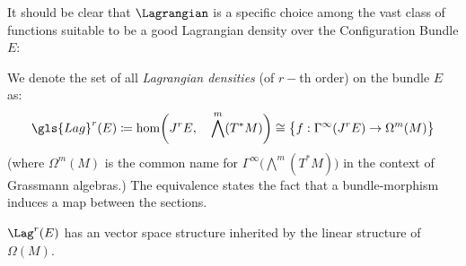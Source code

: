 \documentclass[Main]{subfiles}
\begin{document}
	It should be clear that $\Lagrangian$ is a specific choice among the vast class of functions suitable to be a good Lagrangian density over the  Configuration Bundle $E$:
	\begin{definition}\label{Def:LagrangianDensities}
		We denote the set of all \emph{Lagrangian densities} (of $r-$th order) on the bundle $E$ as:
		\begin{displaymath}
			\gls{Lag}^r (E) \coloneqq \hom\biggr(J^r E,\quad \bigwedge^m( T^*M)\biggr)  \cong \big\{f:\Gamma^\infty(J^r E) \rightarrow \Omega^m(M)  \big\}
		\end{displaymath}
	(where $\Omega^m(M)$ is the common name for $\Gamma^\infty \big( \bigwedge^m( T^*M) \big)$ in the context of Grassmann algebras.)
	The equivalence states the fact that a bundle-morphism induces a map between the sections.
	\end{definition}
	\begin{proposition}
		$\Lag^r(E)$ has an vector space structure inherited by the linear structure of $\Omega(M)$.
	\end{proposition}
	
\end{document}
